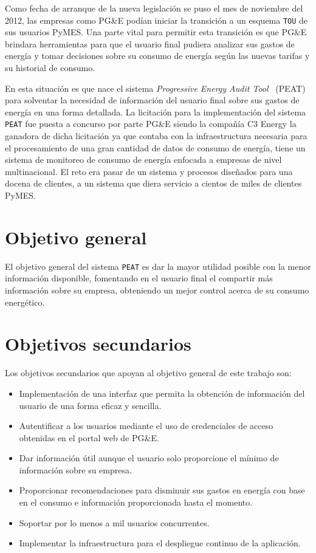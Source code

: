 Como fecha de arranque de la nueva legislación se puso el mes de noviembre del 2012,
las empresas como PG\&E podían iniciar la transición a un esquema \texttt{TOU}
de sus usuarios PyMES. Una parte vital para permitir esta transición es que
PG\&E brindara herramientas para que el usuario final pudiera analizar sus
gastos de energía y tomar decisiones sobre su consumo de energía según las
nuevas tarifas y su historial de consumo.

En esta situación es que nace el sistema \textit{Progressive
  Energy Audit Tool} \ (PEAT) para solventar la necesidad de información
del usuario final sobre sus gastos de energía en una forma detallada.
La licitación para la implementación del sistema \texttt{PEAT} fue puesta
a concurso por parte PG\&E siendo la compañía C3 Energy la ganadora de dicha
licitación  ya que contaba con la infraestructura necesaria para el
procesamiento de una gran cantidad de datos de consumo de energía,
tiene un sistema de monitoreo de consumo de energía enfocada a empresas de nivel
multinacional. El reto era pasar de un sistema y procesos diseñados
para una docena de clientes, a un sistema que diera servicio a
cientos de miles de clientes PyMES.

\section{Objetivo general}

El objetivo general del sistema \texttt{PEAT} es dar la mayor utilidad posible
con la menor información disponible, fomentando en el usuario final el
compartir más información sobre su empresa, obteniendo un mejor control
acerca de su consumo energético.

\section{Objetivos secundarios}

Los objetivos secundarios que apoyan al objetivo general de este trabajo son:
\begin{itemize}
\item Implementación de una interfaz que permita la obtención
  de información del usuario de una forma eficaz y sencilla.
\item Autentificar a los usuarios mediante el uso de credenciales de acceso
  obtenidas en el portal web de PG\&E.
\item Dar información útil aunque el usuario solo proporcione el
  mínimo de información sobre su empresa.
\item Proporcionar recomendaciones para disminuir sus
  gastos en energía con base en el consumo e información proporcionada
  hasta el momento.
\item Soportar por lo menos a mil usuarios concurrentes.
\item Implementar la infraestructura para el despliegue continuo de la
  aplicación.
\end{itemize}

